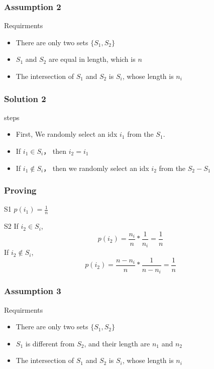 \documentclass[notheorems, aspectratio=54]{beamer}
\begin{document}
\begin{frame}
    \frametitle{Assumption 2}
    \begin{block}{Requirments}
        \begin{itemize}
            \item There are only two sets $\{S_1, S_2\}$
            \item $S_1$ and $S_2$ are equal in length, which is $n$
            \item The intersection of $S_1$ and $S_2$ is $S_i$, whose length is $n_i$
        \end{itemize}
    \end{block}
\end{frame}
\begin{frame}
    \frametitle{Solution 2}
    \begin{block}{steps}
        \begin{itemize}
            \item First, We randomly select an idx $i_1$ from the $S_1$.
            \item If $i_1 \in S_i$， then $i_2 = i_1$
            \item If $i_1 \notin S_i$， then we randomly select an idx $i_2$ from the $S_2-S_1$
        \end{itemize}
    \end{block}
\end{frame}
\begin{frame}
    \frametitle{Proving}
    \begin{block}{S1}
        $p(i_1) = \frac{1}{n}$
    \end{block}
    \begin{block}{S2}
        If $i_2 \in S_i$, 
        $$
            p(i_2) = \frac{n_i}{n}*\frac{1}{n_i} = \frac{1}{n}
        $$
        If $i_2 \notin S_i$, 
        $$
            p(i_2) = \frac{n-n_i}{n}*\frac{1}{n-n_i} = \frac{1}{n}
        $$
    \end{block}
\end{frame}

\begin{frame}
    \frametitle{Assumption 3}
    \begin{block}{Requirments}
        \begin{itemize}
            \item There are only two sets $\{S_1, S_2\}$
            \item $S_1$ is different from $S_2$, and their length are $n_1$ and $n_2$
            \item The intersection of $S_1$ and $S_2$ is $S_i$, whose length is $n_i$
        \end{itemize}
    \end{block}
\end{frame}
\end{document}

